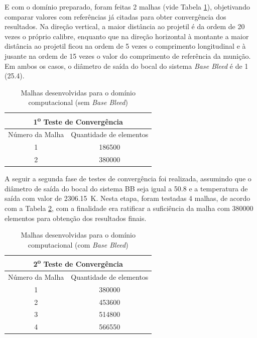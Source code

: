 E com o domínio preparado, foram feitas 2 malhas (vide Tabela \ref{tab:tabela-malhas-inicial}), objetivando comparar valores com referências já citadas \cite{Mahmoud2009} para obter convergência dos resultados. Na direção vertical, a maior distância ao projetil é da ordem de 20 vezes o próprio calibre, enquanto que na direção horizontal à montante a maior distância ao projetil ficou na ordem de 5 vezes o comprimento longitudinal e à jusante na ordem de 15 vezes o valor do comprimento de referência da munição. Em ambos os casos, o diâmetro de saída do bocal do sistema \textit{Base Bleed} é de \qty{1}{\polegada} (\qty{25,4}{\millimetre}).

\begin{table}[ht]
\centering
\caption[Malhas desenvolvidas para o domínio computacional (sem \textit{Base Bleed})]{Malhas desenvolvidas para o domínio computacional (sem \textit{Base Bleed})}
\vspace{0.5cm}
\begin{tabular}{c|c}
\multicolumn{2}{c}{1\textsuperscript{o} Teste de Convergência} \\
\hline 
Número da Malha & Quantidade de elementos \\ 
\hline
1 & \num{186500} \\
2 & \num{380000}
\end{tabular}
\label{tab:tabela-malhas-inicial}
\end{table}

A seguir a segunda fase de testes de convergência foi realizada, assumindo que o diâmetro de saída do bocal do sistema BB seja igual a \qty{50,8}{\millimetre} e a temperatura de saída com valor de \qty{2306,15}{\kelvin}. Nesta etapa, foram testadas 4 malhas, de acordo com a Tabela \ref{tab:tabela-malhas-secundaria}, com a finalidade era ratificar a suficiência da malha com \num{380000} elementos para obtenção dos resultados finais.

\begin{table}[ht]
\centering
\caption[Malhas desenvolvidas para o domínio computacional (com \textit{Base Bleed})]{Malhas desenvolvidas para o domínio computacional (com \textit{Base Bleed})}
\vspace{0.5cm}
\begin{tabular}{c|c}
\multicolumn{2}{c}{2\textsuperscript{o} Teste de Convergência} \\
\hline 
Número da Malha & Quantidade de elementos \\ 
\hline
1 & \num{380000} \\
2 & \num{453600} \\
3 & \num{514800} \\
4 & \num{566550}
\end{tabular}
\label{tab:tabela-malhas-secundaria}
\end{table}

